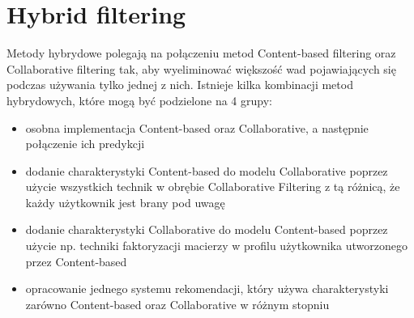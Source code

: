 \section{Hybrid filtering}


Metody hybrydowe polegają na połączeniu metod Content-based filtering oraz Collaborative filtering tak, aby wyeliminować większość wad pojawiających się podczas używania tylko jednej z nich. Istnieje kilka kombinacji metod hybrydowych, które mogą być podzielone na 4 grupy:
\begin{itemize}
	\item osobna implementacja Content-based oraz Collaborative, a następnie połączenie ich predykcji 
	\item dodanie charakterystyki Content-based do modelu Collaborative poprzez użycie wszystkich technik w obrębie Collaborative Filtering z tą różnicą, że każdy użytkownik jest brany pod uwagę
	\item dodanie charakterystyki Collaborative do modelu Content-based poprzez użycie np. techniki faktoryzacji macierzy w profilu użytkownika utworzonego przez Content-based
	\item opracowanie jednego systemu rekomendacji, który używa charakterystyki zarówno Content-based oraz Collaborative w różnym stopniu
\end{itemize}
